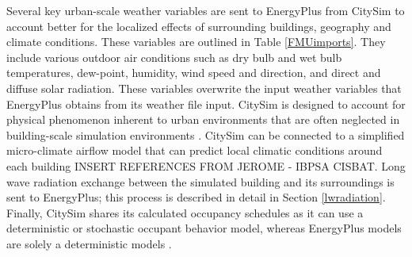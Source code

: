 \documentclass{tBPS2e}
\theoremstyle{plain}
\theoremstyle{definition}
\theoremstyle{remark}
\newcommand{\noteDT}[1]{\footnote{\textcolor{green}{#1}}}
\begin{document}
Several key urban-scale weather variables are sent to EnergyPlus from CitySim
to account better for the localized effects of surrounding buildings,
geography and climate conditions. These variables are outlined in Table \ref{FMUimports}. 
They include various outdoor air
conditions such as dry bulb and wet bulb temperatures, dew-point, humidity, wind
speed and direction, and direct and diffuse solar radiation. These variables
overwrite the input weather variables that EnergyPlus obtains from its weather
file input. CitySim is designed to account for physical phenomenon inherent to
urban environments that are often neglected in building-scale simulation
environments \citep{Robinson:2004cr,Robinson:2009tm}. CitySim can be connected to a simplified micro-climate airflow model that can 
predict local climatic conditions around each building INSERT REFERENCES FROM JEROME - IBPSA CISBAT. Long wave radiation
exchange between the simulated building and its surroundings is sent to
EnergyPlus; this process is described in detail in Section \ref{lwradiation}.
Finally, CitySim shares its calculated occupancy schedules as it can use a deterministic 
or stochastic occupant behavior model, whereas EnergyPlus models are solely a deterministic models \citep{Haldi:2011dr}.

\end{document}
